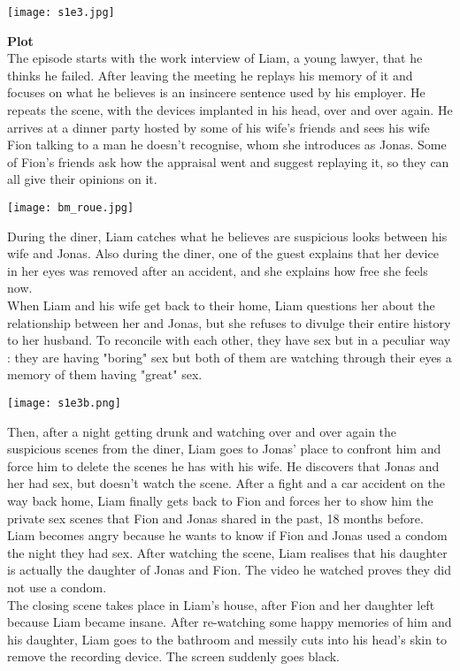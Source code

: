 \documentclass{article}
\begin{document}
\begin{center}
\texttt{[image: s1e3.jpg]}
\end{center}

\textbf{Plot}\\
The episode starts with the work interview of Liam, a young lawyer, that he thinks he failed. After leaving the meeting he replays his memory of it and focuses on what he believes is an insincere sentence used by his employer. He repeats the scene, with the devices implanted in his head, over and over again. He arrives at a dinner party hosted by some of his wife's friends and sees his wife Fion talking to a man he doesn't recognise, whom she introduces as Jonas. Some of Fion's friends ask how the appraisal went and suggest replaying it, so they can all give their opinions on it.
\begin{center}
\texttt{[image: bm\_roue.jpg]}
\end{center}
During the diner, Liam catches what he believes are suspicious looks between his wife and Jonas. Also during the diner, one of the guest explains that her device in her eyes was removed after an accident, and she explains how free she feels now.\\
When Liam and his wife get back to their home, Liam questions her about the relationship between her and Jonas, but she refuses to divulge their entire history to her husband. To reconcile with each other, they have sex but in a peculiar way : they are having "boring" sex but both of them are watching through their eyes a memory of them having "great" sex.
\begin{center}
\texttt{[image: s1e3b.png]}
\end{center} Then, after a night getting drunk and watching over and over again the suspicious scenes from the diner, Liam goes to Jonas' place to confront him and force him to delete the scenes he has with his wife. He discovers that Jonas and her had sex, but doesn't watch the scene. After a fight and a car accident on the way back home, Liam finally gets back to Fion and forces her to show him the private sex scenes that Fion and Jonas shared in the past, 18 months before. Liam becomes angry because he wants to know if Fion and Jonas used a condom the night they had sex. After watching the scene, Liam realises that his daughter is actually the daughter of Jonas and Fion. The video he watched proves they did not use a condom.\\
The closing scene takes place in Liam's house, after Fion and her daughter left because Liam became insane. After re-watching some happy memories of him and his daughter, Liam goes to the bathroom and messily cuts into his head's skin to remove the recording device. The screen suddenly goes black.
\end{document}
